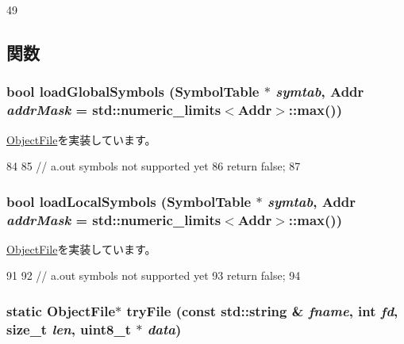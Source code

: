 \begin{DoxyCode}
49 {}
\end{DoxyCode}


\subsection{関数}
\hypertarget{classAoutObject_a1de102f86bbb53d20455d9e78be53935}{
\subsubsection[{loadGlobalSymbols}]{\setlength{\rightskip}{0pt plus 5cm}bool loadGlobalSymbols (SymbolTable $\ast$ {\em symtab}, \/  {\bf Addr} {\em addrMask} = {\ttfamily std::numeric\_\-limits$<${\bf Addr}$>$::max()})}}
\label{classAoutObject_a1de102f86bbb53d20455d9e78be53935}


\hyperlink{classObjectFile_abd8b86c98494f055ba7e0babbd55f4a0}{ObjectFile}を実装しています。


\begin{DoxyCode}
84 {
85     // a.out symbols not supported yet
86     return false;
87 }
\end{DoxyCode}
\hypertarget{classAoutObject_aab9393b89c15838ac1b842e642f981bb}{
\subsubsection[{loadLocalSymbols}]{\setlength{\rightskip}{0pt plus 5cm}bool loadLocalSymbols (SymbolTable $\ast$ {\em symtab}, \/  {\bf Addr} {\em addrMask} = {\ttfamily std::numeric\_\-limits$<${\bf Addr}$>$::max()})}}
\label{classAoutObject_aab9393b89c15838ac1b842e642f981bb}


\hyperlink{classObjectFile_a15e7fbacc339ac9a4d50e4aa36591339}{ObjectFile}を実装しています。


\begin{DoxyCode}
91 {
92     // a.out symbols not supported yet
93     return false;
94 }
\end{DoxyCode}
\hypertarget{classAoutObject_af96c4ced69d653731f78ba9d9006e251}{
\subsubsection[{tryFile}]{\setlength{\rightskip}{0pt plus 5cm}static {\bf ObjectFile}$\ast$ tryFile (const std::string \& {\em fname}, \/  int {\em fd}, \/  size\_\-t {\em len}, \/  uint8\_\-t $\ast$ {\em data})}}
\label{classAoutObject_af96c4ced69d653731f78ba9d9006e251}


